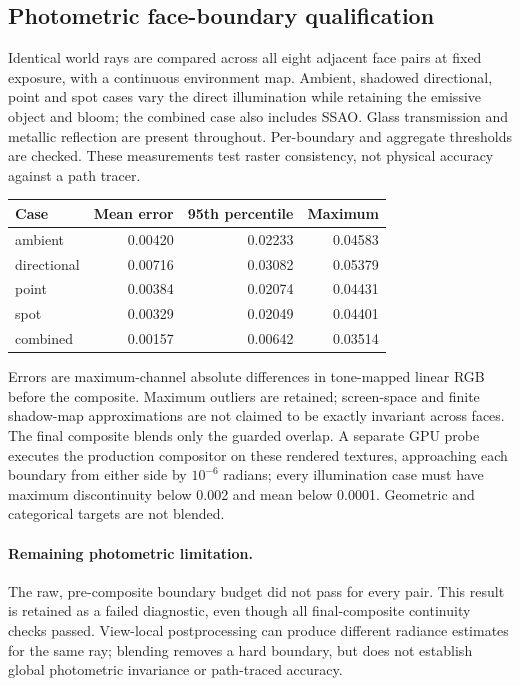 \documentclass{article}
\begin{document}
\subsection{Photometric face-boundary qualification}
Identical world rays are compared across all eight adjacent face pairs at fixed exposure, with a continuous environment map. Ambient, shadowed directional, point and spot cases vary the direct illumination while retaining the emissive object and bloom; the combined case also includes SSAO. Glass transmission and metallic reflection are present throughout. Per-boundary and aggregate thresholds are checked. These measurements test raster consistency, not physical accuracy against a path tracer.
\begin{center}\begin{tabular}{lrrr}\toprule
Case & Mean error & 95th percentile & Maximum \\
\midrule
ambient & 0.00420 & 0.02233 & 0.04583 \\
directional & 0.00716 & 0.03082 & 0.05379 \\
point & 0.00384 & 0.02074 & 0.04431 \\
spot & 0.00329 & 0.02049 & 0.04401 \\
combined & 0.00157 & 0.00642 & 0.03514 \\
\bottomrule\end{tabular}\end{center}
Errors are maximum-channel absolute differences in tone-mapped linear RGB before the composite. Maximum outliers are retained; screen-space and finite shadow-map approximations are not claimed to be exactly invariant across faces. The final composite blends only the guarded overlap. A separate GPU probe executes the production compositor on these rendered textures, approaching each boundary from either side by $10^{-6}$ radians; every illumination case must have maximum discontinuity below 0.002 and mean below 0.0001. Geometric and categorical targets are not blended.
\paragraph{Remaining photometric limitation.} The raw, pre-composite boundary budget did not pass for every pair. This result is retained as a failed diagnostic, even though all final-composite continuity checks passed. View-local postprocessing can produce different radiance estimates for the same ray; blending removes a hard boundary, but does not establish global photometric invariance or path-traced accuracy.
\end{document}

